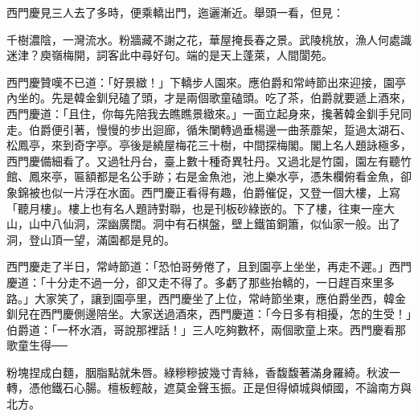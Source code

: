 西門慶見三人去了多時，便乘轎出門，迤邐漸近。舉頭一看，但見：

千樹濃陰，一灣流水。粉牆藏不謝之花，華屋掩長春之景。武陵桃放，漁人何處識迷津？庾嶺梅開，詞客此中尋好句。端的是天上蓬萊，人間閬苑。

西門慶贊嘆不已道：「好景緻！」下轎步人園來。應伯爵和常峙節出來迎接，園亭內坐的。先是韓金釧兒磕了頭，才是兩個歌童磕頭。吃了茶，伯爵就要遞上酒來，西門慶道：「且住，你每先陪我去瞧瞧景緻來。」一面立起身來，攙著韓金釧手兒同走。伯爵便引著，慢慢的步出迴廊，循朱闌轉過垂楊邊一曲荼蘼架，踅過太湖石、松鳳亭，來到奇字亭。亭後是繞屋梅花三十樹，中間探梅閣。閣上名人題詠極多，西門慶備細看了。又過牡丹台，臺上數十種奇異牡丹。又過北是竹園，園左有聽竹館、鳳來亭，匾額都是名公手跡；右是金魚池，池上樂水亭，憑朱欄俯看金魚，卻象錦被也似一片浮在水面。西門慶正看得有趣，伯爵催促，又登一個大樓，上寫「聽月樓」。樓上也有名人題詩對聯，也是刊板砂綠嵌的。下了樓，往東一座大山，山中八仙洞，深幽廣闊。洞中有石棋盤，壁上鐵笛銅簫，似仙家一般。出了洞，登山頂一望，滿園都是見的。

西門慶走了半日，常峙節道：「恐怕哥勞倦了，且到園亭上坐坐，再走不遲。」西門慶道：「十分走不過一分，卻又走不得了。多虧了那些抬轎的，一日趕百來里多路。」大家笑了，讓到園亭里，西門慶坐了上位，常峙節坐東，應伯爵坐西，韓金釧兒在西門慶側邊陪坐。大家送過酒來，西門慶道：「今日多有相擾，怎的生受！」伯爵道：「一杯水酒，哥說那裡話！」三人吃夠數杯，兩個歌童上來。西門慶看那歌童生得──

粉塊捏成白麵，胭脂點就朱唇。綠糝糝披幾寸青絲，香馥馥著滿身羅綺。秋波一轉，憑他鐵石心腸。檀板輕敲，遮莫金聲玉振。正是但得傾城與傾國，不論南方與北方。


